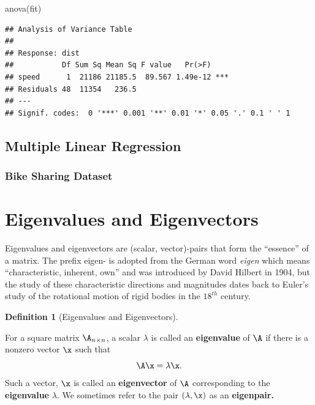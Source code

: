 \documentclass[
]{article}
\newenvironment{Shaded}{\begin{snugshade}}{\end{snugshade}}
\newcommand{\FunctionTok}[1]{\textcolor[rgb]{0.00,0.00,0.00}{#1}}
\newcommand{\NormalTok}[1]{#1}
\theoremstyle{definition}
\newtheorem{definition}{Definition}[section]
\theoremstyle{definition}
\theoremstyle{definition}
\theoremstyle{definition}
\theoremstyle{remark}
\begin{document}
\begin{Shaded}
\begin{Highlighting}[]
\FunctionTok{anova}\NormalTok{(fit)}
\end{Highlighting}
\end{Shaded}

\begin{verbatim}
## Analysis of Variance Table
## 
## Response: dist
##           Df Sum Sq Mean Sq F value   Pr(>F)    
## speed      1  21186 21185.5  89.567 1.49e-12 ***
## Residuals 48  11354   236.5                     
## ---
## Signif. codes:  0 '***' 0.001 '**' 0.01 '*' 0.05 '.' 0.1 ' ' 1
\end{verbatim}

\hypertarget{multiple-linear-regression}{%
\subsection{Multiple Linear Regression}\label{multiple-linear-regression}}

\hypertarget{bike-sharing-dataset}{%
\subsubsection{Bike Sharing Dataset}\label{bike-sharing-dataset}}

\hypertarget{eigen}{%
\section{Eigenvalues and Eigenvectors}\label{eigen}}

Eigenvalues and eigenvectors are (scalar, vector)-pairs that form the ``essence'' of a matrix. The prefix eigen- is adopted from the German word \emph{eigen} which means ``characteristic, inherent, own'' and was introduced by David Hilbert in 1904, but the study of these characteristic directions and magnitudes dates back to Euler's study of the rotational motion of rigid bodies in the \(18^{th}\) century.

\begin{definition}[Eigenvalues and Eigenvectors]
\protect\hypertarget{def:eigsdef}{}\label{def:eigsdef}

For a square matrix \(\A_{n\times n}\), a scalar \(\lambda\) is called an \textbf{eigenvalue} of \(\A\) if there is a nonzero vector \(\x\) such that \[\A\x=\lambda\x.\] Such a vector, \(\x\) is called an \textbf{eigenvector} of \(\A\) corresponding to the \textbf{eigenvalue} \(\lambda\). We sometimes refer to the pair \((\lambda,\x)\) as an \textbf{eigenpair.}

\end{definition}
\end{document}
